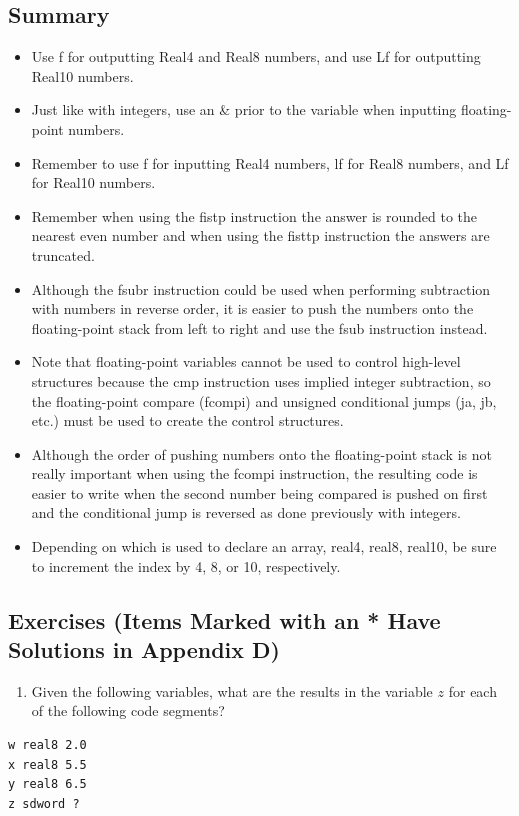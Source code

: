 \documentclass[10pt]{book}
\begin{document}
\subsection{Summary}
\begin{itemize}
  \item Use f for outputting Real4 and Real8 numbers, and use Lf for outputting Real10 numbers.
  \item Just like with integers, use an \& prior to the variable when inputting floating-point numbers.
  \item Remember to use f for inputting Real4 numbers, lf for Real8 numbers, and Lf for Real10 numbers.
  \item Remember when using the fistp instruction the answer is rounded to the nearest even number and when using the fisttp instruction the answers are truncated.
  \item Although the fsubr instruction could be used when performing subtraction with numbers in reverse order, it is easier to push the numbers onto the floating-point stack from left to right and use the fsub instruction instead.
  \item Note that floating-point variables cannot be used to control high-level structures because the cmp instruction uses implied integer subtraction, so the floating-point compare (fcompi) and unsigned conditional jumps (ja, jb, etc.) must be used to create the control structures.
  \item Although the order of pushing numbers onto the floating-point stack is not really important when using the fcompi instruction, the resulting code is easier to write when the second number being compared is pushed on first and the conditional jump is reversed as done previously with integers.
  \item Depending on which is used to declare an array, real4, real8, real10, be sure to increment the index by 4, 8, or 10, respectively.
\end{itemize}

\subsection{Exercises (Items Marked with an * Have Solutions in Appendix D)}
\begin{enumerate}
  \item Given the following variables, what are the results in the variable $z$ for each of the following code segments?
\end{enumerate}
\begin{verbatim}
w real8 2.0
x real8 5.5
y real8 6.5
z sdword ?
\end{verbatim}
\end{document}
